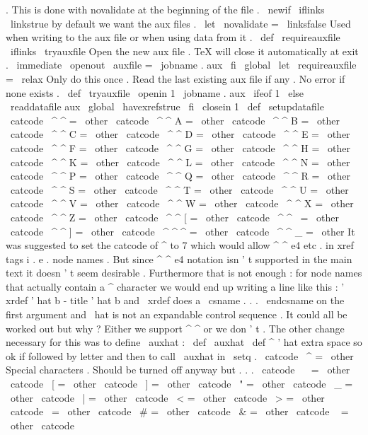 {{{{.
%
This
is
done
with
novalidate
at
the
beginning
of
the
file
.
%
\
newif
\
iflinks
\
linkstrue
%
by
default
we
want
the
aux
files
.
\
let
\
novalidate
=
\
linksfalse
%
Used
when
writing
to
the
aux
file
or
when
using
data
from
it
.
\
def
\
requireauxfile
{
%
\
iflinks
\
tryauxfile
%
Open
the
new
aux
file
.
TeX
will
close
it
automatically
at
exit
.
\
immediate
\
openout
\
auxfile
=
\
jobname
.
aux
\
fi
\
global
\
let
\
requireauxfile
=
\
relax
%
Only
do
this
once
.
}
%
Read
the
last
existing
aux
file
if
any
.
No
error
if
none
exists
.
%
\
def
\
tryauxfile
{
%
\
openin
1
\
jobname
.
aux
\
ifeof
1
\
else
\
readdatafile
{
aux
}
%
\
global
\
havexrefstrue
\
fi
\
closein
1
}
\
def
\
setupdatafile
{
%
\
catcode
\
^
^
=
\
other
\
catcode
\
^
^
A
=
\
other
\
catcode
\
^
^
B
=
\
other
\
catcode
\
^
^
C
=
\
other
\
catcode
\
^
^
D
=
\
other
\
catcode
\
^
^
E
=
\
other
\
catcode
\
^
^
F
=
\
other
\
catcode
\
^
^
G
=
\
other
\
catcode
\
^
^
H
=
\
other
\
catcode
\
^
^
K
=
\
other
\
catcode
\
^
^
L
=
\
other
\
catcode
\
^
^
N
=
\
other
\
catcode
\
^
^
P
=
\
other
\
catcode
\
^
^
Q
=
\
other
\
catcode
\
^
^
R
=
\
other
\
catcode
\
^
^
S
=
\
other
\
catcode
\
^
^
T
=
\
other
\
catcode
\
^
^
U
=
\
other
\
catcode
\
^
^
V
=
\
other
\
catcode
\
^
^
W
=
\
other
\
catcode
\
^
^
X
=
\
other
\
catcode
\
^
^
Z
=
\
other
\
catcode
\
^
^
[
=
\
other
\
catcode
\
^
^
\
=
\
other
\
catcode
\
^
^
]
=
\
other
\
catcode
\
^
^
^
=
\
other
\
catcode
\
^
^
_
=
\
other
%
It
was
suggested
to
set
the
catcode
of
^
to
7
which
would
allow
^
^
e4
etc
.
%
in
xref
tags
i
.
e
.
node
names
.
But
since
^
^
e4
notation
isn
'
t
%
supported
in
the
main
text
it
doesn
'
t
seem
desirable
.
Furthermore
%
that
is
not
enough
:
for
node
names
that
actually
contain
a
^
%
character
we
would
end
up
writing
a
line
like
this
:
'
xrdef
{
'
hat
%
b
-
title
}
{
'
hat
b
}
and
\
xrdef
does
a
\
csname
.
.
.
\
endcsname
on
the
first
%
argument
and
\
hat
is
not
an
expandable
control
sequence
.
It
could
%
all
be
worked
out
but
why
?
Either
we
support
^
^
or
we
don
'
t
.
%
%
The
other
change
necessary
for
this
was
to
define
\
auxhat
:
%
\
def
\
auxhat
{
\
def
^
{
'
hat
}
}
%
extra
space
so
ok
if
followed
by
letter
%
and
then
to
call
\
auxhat
in
\
setq
.
%
\
catcode
\
^
=
\
other
%
%
Special
characters
.
Should
be
turned
off
anyway
but
.
.
.
\
catcode
\
~
=
\
other
\
catcode
\
[
=
\
other
\
catcode
\
]
=
\
other
\
catcode
\
"
=
\
other
\
catcode
\
_
=
\
other
\
catcode
\
|
=
\
other
\
catcode
\
<
=
\
other
\
catcode
\
>
=
\
other
\
catcode
\
=
\
other
\
catcode
\
#
=
\
other
\
catcode
\
&
=
\
other
\
catcode
\
%
=
\
other
\
catcode
}}}}}
